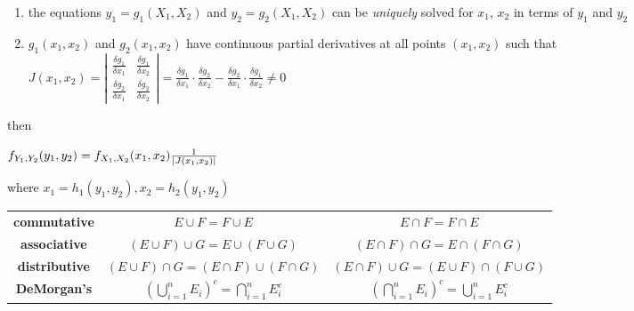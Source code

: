 \documentclass[10pt, landscape]{article}
\begin{document}
\begin{multicols*}{3}
  \begin{enumerate}
    \item the equations $y_1 = g_1 (X_1, X_2)$ and $y_2 = g_2 (X_1, X_2)$ can be \textit{uniquely} solved for $x_1$, $x_2$ in terms of $y_1$ and $y_2$
    \item $g_1(x_1, x_2)$ and $g_2(x_1, x_2)$ have continuous partial derivatives at all points $(x_1, x_2)$ 
      such that $J(x_1, x_2) = \left\vert \begin{smallmatrix} \frac{\delta g_1}{\delta x_1} & \frac{\delta g_1}{\delta x_2}
      \\ \frac{\delta g_2}{\delta x_1} & \frac{\delta g_2}{\delta x_2} \end{smallmatrix} \right\vert = \frac{\delta g_1}{\delta x_1} \cdot \frac{\delta g_2}{\delta x_2} - \frac{\delta g_2}{\delta x_1} \cdot \frac{\delta g_1}{\delta x_2} \neq 0 $
  \end{enumerate}

  then 
  \begin{tightcenter}
    $f_{Y_1, Y_2} (y_1, y_2) = f_{X_1, X_2} (x_1, x_2) \frac{1}{\vert J(x_1, x_2) \vert} $

    where $x_1 = h_1(y_1, y_2), x_2 = h_2(y_1, y_2)$
  \end{tightcenter}
















































\end{multicols*}

\begin{center}
  \begin{tabular}{ccc}
    \textbf{commutative} & $E \cup F = F \cup E$ & $E \cap F = F \cap E$ \\
    \textbf{associative} & $(E \cup F) \cup G = E \cup (F \cup G)$ &  $(E \cap F) \cap G = E \cap (F \cap G)$ \\
    \textbf{distributive} & $(E \cup F) \cap G = (E \cap F) \cup (F \cap G)$ & $(E \cap F) \cup G = (E \cup F) \cap (F \cup G)$ \\
    \textbf{DeMorgan's} & $(\bigcup\limits^n_{i=1} E_i)^c = \bigcap\limits^n_{i=1}E_i^c$ & $(\bigcap\limits^n_{i=1}E_i)^c = \bigcup\limits^n_{i=1}E_i^c$ \\
  \end{tabular}
\end{center}
\end{document}
